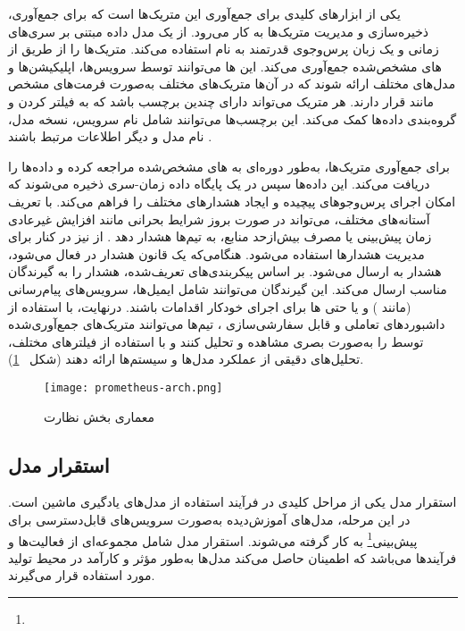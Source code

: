 یکی از ابزارهای کلیدی برای جمع‌آوری این متریک‌ها  است که برای جمع‌آوری، ذخیره‌سازی و مدیریت متریک‌ها به کار می‌رود.  از یک مدل داده مبتنی بر سری‌های زمانی و یک زبان پرس‌وجوی قدرتمند به نام  استفاده می‌کند.  متریک‌ها را از طریق  از های مشخص‌شده جمع‌آوری می‌کند. این ها می‌توانند توسط سرویس‌ها، اپلیکیشن‌ها و مدل‌های مختلف ارائه شوند که در آن‌ها متریک‌های مختلف به‌صورت فرمت‌های مشخص مانند  قرار دارند. هر متریک می‌تواند دارای چندین برچسب باشد که به فیلتر کردن و گروه‌بندی داده‌ها کمک می‌کند. این برچسب‌ها می‌توانند شامل نام سرویس، نسخه مدل، نام مدل و دیگر اطلاعات مرتبط باشند \cite{Prometheus1}.

برای جمع‌آوری متریک‌ها،  به‌طور دوره‌ای به های مشخص‌شده مراجعه کرده و داده‌ها را دریافت می‌کند. این داده‌ها سپس در یک پایگاه داده زمان-سری ذخیره می‌شوند که امکان اجرای پرس‌وجوهای پیچیده و ایجاد هشدارهای مختلف را فراهم می‌کند. با تعریف آستانه‌های مختلف،  می‌تواند در صورت بروز شرایط بحرانی مانند افزایش غیرعادی زمان پیش‌بینی یا مصرف بیش‌ازحد منابع، به تیم‌ها هشدار دهد \cite{Prometheus1}. از  نیز در کنار  برای مدیریت هشدارها استفاده می‌شود. هنگامی‌که یک قانون هشدار در  فعال می‌شود، هشدار به  ارسال می‌شود.  بر اساس پیکربندی‌های تعریف‌شده، هشدار را به گیرندگان مناسب ارسال می‌کند. این گیرندگان می‌توانند شامل ایمیل‌ها، سرویس‌های پیام‌رسانی (مانند ) و یا حتی ‌ها برای اجرای خودکار اقدامات باشند. درنهایت، با استفاده از داشبوردهای تعاملی و قابل سفارشی‌سازی ، تیم‌ها می‌توانند متریک‌های جمع‌آوری‌شده توسط  را به‌صورت بصری مشاهده و تحلیل کنند و با استفاده از فیلترهای مختلف، تحلیل‌های دقیقی از عملکرد مدل‌ها و سیستم‌ها ارائه دهند \cite{Grafana} (شکل ~\ref{fig: monitoring arch}).

\begin{figure}[!t]
	\centering
	\texttt{[image: prometheus-arch.png]}
	\caption{معماری بخش نظارت}
	\label{fig: monitoring arch}
\end{figure} 

 
\subsection{استقرار مدل}

استقرار مدل یکی از مراحل کلیدی در فرآیند استفاده از مدل‌های یادگیری ماشین است. در این مرحله، مدل‌های آموزش‌دیده به‌صورت سرویس‌های قابل‌دسترسی برای پیش‌بینی\footnote{} به کار گرفته می‌شوند. استقرار مدل شامل مجموعه‌ای از فعالیت‌ها و فرآیندها می‌باشد که اطمینان حاصل می‌کند مدل‌ها به‌طور مؤثر و کارآمد در محیط تولید مورد استفاده قرار می‌گیرند.

